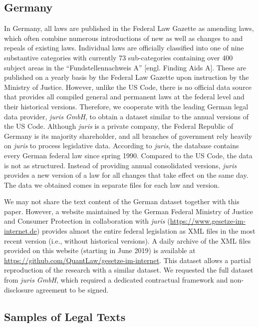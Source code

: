 \subsection{Germany}

In Germany,
all laws are published in the Federal Law Gazette as amending laws,
which often combine numerous introductions of new as well as changes to and repeals of existing laws.
Individual laws are officially classified into one of nine substantive categories with currently 73 sub-categories containing over 400 subject areas in the ``Fundstellennachweis A'' [engl. Finding Aids A].
These are published on a yearly basis by the Federal Law Gazette upon instruction by the Ministry of Justice.
However, unlike the US Code, there is no official data source that provides all compiled general and permanent laws at the federal level and
their historical versions.
Therefore, we cooperate with the leading German legal data provider, \emph{juris GmbH}, 
to obtain a dataset similar to the annual versions of the US Code. 
Although \emph{juris} is a private company, 
the Federal Republic of Germany is its majority shareholder, 
and all branches of government rely heavily on \emph{juris} to process legislative data. 
According to \emph{juris}, the database contains every German federal law since spring 1990. 
Compared to the US Code, the data is not as structured. 
Instead of providing annual consolidated versions, \emph{juris} provides a new version of a law for all changes that take effect on the same day.
The data we obtained comes in separate files for each law and version.

We may not share the text content of the German dataset together with this paper.
However, a website maintained by the German Federal Ministry of Justice and Consumer Protection in collaboration with \emph{juris} (\url{https://www.gesetze-im-internet.de}) 
provides almost the entire federal legislation as XML files in the most recent version (i.e., without historical versions).
A daily archive of the XML files provided on this website (starting in June 2019) is available at \url{https://github.com/QuantLaw/gesetze-im-internet}.
This dataset allows a partial reproduction of the research with a similar dataset.
We requested the full dataset from \emph{juris GmbH}, 
which required a dedicated contractual framework and non-disclosure agreement to be signed.

\subsection{Samples of Legal Texts}
\label{subsec:textsamples}


